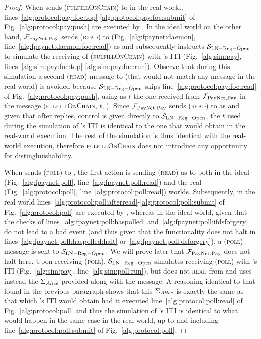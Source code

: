 \begin{proof}
  When \environment{} sends (\textsc{fulfillOnChain}) to \alice{} in the real
  world, lines~\ref{alg:protocol:pay:foc:top}-\ref{alg:protocol:pay:foc:submit}
  of Fig.~\ref{alg:protocol:pay:push} are executed by \alice. In the ideal world
  on the other hand, $\mathcal{F}_{\mathrm{PayNet}}{}_{\mathrm{, Pay}}$ sends (\textsc{read}) to
  \ledger{} (Fig.~\ref{alg:fpaynet:daemon},
  line~\ref{alg:fpaynet:daemon:foc:read}) as \alice{} and subsequently instructs
  $\mathcal{S}_{\mathrm{LN - Reg - Open}}$ to simulate the receiving of
  (\textsc{fulfillOnChain}) with \alice{}'s ITI (Fig.~\ref{alg:sim:pay},
  lines~\ref{alg:sim:pay:foc:top}-\ref{alg:sim:pay:foc:run}). Observe that
  during this simulation a second (\textsc{read}) message to \ledger{} (that
  would not match any message in the real world) is avoided because
  $\mathcal{S}_{\mathrm{LN - Reg - Open}}$ skips
  line~\ref{alg:protocol:pay:foc:read} of Fig.~\ref{alg:protocol:pay:push},
  using as $t$ the one received from $\mathcal{F}_{\mathrm{PayNet}}{}_{\mathrm{, Pay}}$ in the
  message (\textsc{fulfillOnChain}, $t$, \alice). Since $\mathcal{F}_{\mathrm{PayNet}}{}_{\mathrm{,
  Pay}}$ sends (\textsc{read}) to \ledger{} as \alice{} and given that after
  \ledger{} replies, control is given directly to $\mathcal{S}_{\mathrm{LN - Reg
  - Open}}$, the $t$ used during the simulation of \alice's ITI is identical to
  the one that \alice{} would obtain in the real-world execution. The rest of
  the simulation is thus identical with the real-world execution, therefore
  \textsc{fulfillOnChain} does not introduce any opportunity for
  distinghuishability.

  When \environment{} sends (\textsc{poll}) to \alice, the first action is
  sending (\textsc{read}) as \alice{} to \ledger{} both in the ideal
  (Fig.~\ref{alg:fpaynet:poll}, line~\ref{alg:fpaynet:poll:read}) and the real
  (Fig.~\ref{alg:protocol:poll}, line~\ref{alg:protocol:poll:read}) worlds.
  Subsequently, in the real world
  lines~\ref{alg:protocol:poll:afterread}-\ref{alg:protocol:poll:submit} of
  Fig.~\ref{alg:protocol:poll} are executed by \alice, whereas in the ideal
  world, given that the checks of lines~\ref{alg:fpaynet:poll:haspolled}
  and~\ref{alg:fpaynet:poll:ifdsforgery} do not lead to a bad event (and thus
  given that the functionality does not halt in
  lines~\ref{alg:fpaynet:poll:haspolled:halt}
  or~\ref{alg:fpaynet:poll:dsforgery}), a (\textsc{poll}) message is sent to
  $\mathcal{S}_{\mathrm{LN - Reg - Open}}$. We will prove later that
  $\mathcal{F}_{\mathrm{PayNet}}{}_{\mathrm{, Pay}}$ does not halt here. Upon receiving
  (\textsc{poll}), $\mathcal{S}_{\mathrm{LN - Reg - Open}}$ simulates receiving
  (\textsc{poll}) with \alice's ITI (Fig.~\ref{alg:sim:pay},
  line~\ref{alg:sim:poll:run}), but does not \textsc{read} from \ledger{} and
  uses instead the $\Sigma_{\mathit{Alice}}$ provided along with the message. A
  reasoning identical to that found in the previous paragraph shows that this
  $\Sigma_{\mathit{Alice}}$ is exactly the same as that which \alice's ITI would obtain
  had it executed line~\ref{alg:protocol:poll:read} of
  Fig.~\ref{alg:protocol:poll} and thus the simulation of \alice's ITI is
  identical to what would happen in the same case in the real world, up to and
  including line~\ref{alg:protocol:poll:submit} of Fig.~\ref{alg:protocol:poll}.


\end{proof}
